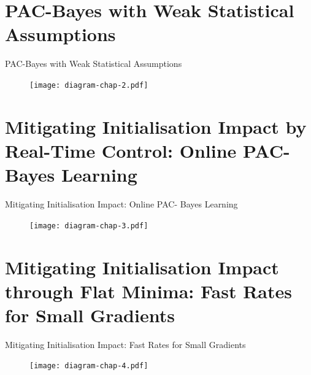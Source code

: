 \documentclass{presentation}
\begin{document}
\section{PAC-Bayes with Weak Statistical Assumptions}

\begin{xframe}{PAC-Bayes with Weak Statistical Assumptions}
  \begin{figure}
      \centering
      \texttt{[image: diagram-chap-2.pdf]}
  \end{figure}
\end{xframe}


\section{Mitigating Initialisation Impact by Real-Time Control: Online PAC- Bayes Learning}

\begin{xframe}{Mitigating Initialisation Impact: Online PAC- Bayes Learning}
    \begin{figure}
        \centering
        \texttt{[image: diagram-chap-3.pdf]}
    \end{figure}
  \end{xframe}


\section{Mitigating Initialisation Impact through Flat Minima: Fast Rates for Small Gradients}

\begin{xframe}{Mitigating Initialisation Impact: Fast Rates for Small Gradients}
    \begin{figure}
        \centering
        \texttt{[image: diagram-chap-4.pdf]}
    \end{figure}
  \end{xframe}
\end{document}

